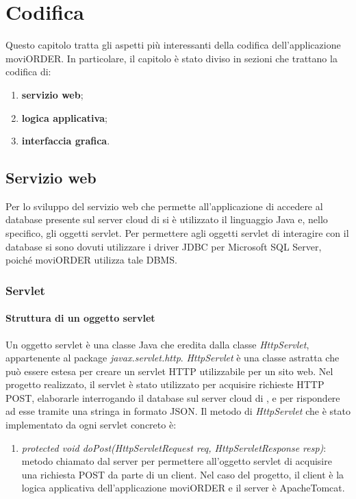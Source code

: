\chapter{Codifica}

Questo capitolo tratta gli aspetti più interessanti della codifica dell'applicazione moviORDER. In particolare, il capitolo è stato diviso in sezioni che trattano la codifica di:
\begin{enumerate}
	\item \textbf{servizio web};
	\item \textbf{logica applicativa};
	\item \textbf{interfaccia grafica}.
\end{enumerate}

\section{Servizio web}

Per lo sviluppo del servizio web che permette all'applicazione di accedere al database presente sul server cloud di \visione{} si è utilizzato il linguaggio Java e, nello specifico, gli oggetti servlet. Per permettere agli oggetti servlet di interagire con il database si sono dovuti utilizzare i driver JDBC per Microsoft SQL Server, poiché moviORDER utilizza tale DBMS. 

\subsection{Servlet}

\subsubsection{Struttura di un oggetto servlet}

Un oggetto servlet è una classe Java che eredita dalla classe \textit{HttpServlet}, appartenente al package \textit{javax.servlet.http}. \textit{HttpServlet} è una classe astratta che può essere estesa per creare un servlet HTTP utilizzabile per un sito web. Nel progetto realizzato, il servlet è stato utilizzato per acquisire richieste HTTP POST, elaborarle interrogando il database sul server cloud di \visione{}, e per rispondere ad esse tramite una stringa in formato JSON. Il metodo di \textit{HttpServlet} che è stato implementato da ogni servlet concreto è:
\begin{enumerate}
	\item \textit{protected void doPost(HttpServletRequest req, HttpServletResponse resp)}: metodo chiamato dal server per permettere all'oggetto servlet di acquisire una richiesta POST da parte di un client. Nel caso del progetto, il client è la logica applicativa dell'applicazione moviORDER e il server è ApacheTomcat.
\end{enumerate}

